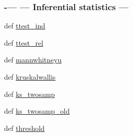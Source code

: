 \begin{DoxyCompactItemize}
\begin{DoxyCompactList}
 \subsubsection*{-\/--- --- Inferential statistics --- }\end{DoxyCompactList}\item 
def \hyperlink{namespacescipy_1_1stats_1_1mstats__basic_a6994b3ffa6820de6b82f68525060f23e}{ttest\+\_\+ind}
\item 
def \hyperlink{namespacescipy_1_1stats_1_1mstats__basic_a8ac2626e4a70c0b0b9dcc56bbb18c54b}{ttest\+\_\+rel}
\item 
def \hyperlink{namespacescipy_1_1stats_1_1mstats__basic_ae60afef26428af19072712ec1a9a60cb}{mannwhitneyu}
\item 
def \hyperlink{namespacescipy_1_1stats_1_1mstats__basic_a875c23dc169db21e4111b9113aea4fda}{kruskalwallis}
\item 
def \hyperlink{namespacescipy_1_1stats_1_1mstats__basic_a81566a96ec62a3f846967f8df39284ae}{ks\+\_\+twosamp}
\item 
def \hyperlink{namespacescipy_1_1stats_1_1mstats__basic_ab635990433961872e4fc99beb2114c6c}{ks\+\_\+twosamp\+\_\+old}
\item 
def \hyperlink{namespacescipy_1_1stats_1_1mstats__basic_a013fd2bad70775253f016f4a37408601}{threshold}
\begin{DoxyCompactList}\small\item\em 


\end{DoxyCompactList}
\end{DoxyCompactItemize}
